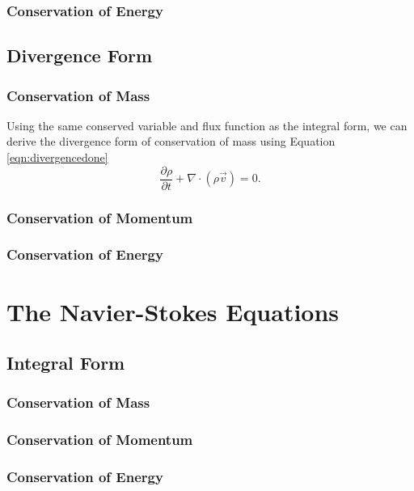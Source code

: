 \subsection{Conservation of Energy}

\section{Divergence Form}

\subsection{Conservation of Mass}
Using the same conserved variable and flux function as the integral form, we can derive the divergence form of conservation of mass using Equation \ref{eqn:divergencedone}
\begin{equation}
	\label{eqn:divergencedone}
	\frac{\partial \rho}{\partial t} + \nabla \cdot (\rho \vec{v}) = 0.
\end{equation}

\subsection{Conservation of Momentum}

\subsection{Conservation of Energy}

\chapter{The Navier-Stokes Equations}

\section{Integral Form}

\subsection{Conservation of Mass}

\subsection{Conservation of Momentum}

\subsection{Conservation of Energy}

